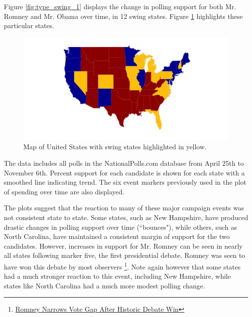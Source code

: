 \documentclass[11pt]{article}\usepackage{graphicx, color}
\newenvironment{knitrout}{}{} %
\begin{document}

Figure \ref{fig:type_swing_1} displays the change in polling support for both Mr. Romney and Mr. Obama over time, in 12 swing states. Figure \ref{fig:swing_map} highlights these particular states.

\begin{knitrout}
\color{fgcolor}\begin{figure}[H]


{\centering \includegraphics[width=\textwidth]{figure/swing_map} 

}

\caption[Map of United States with swing states highlighted in yellow]{Map of United States with swing states highlighted in yellow.\label{fig:swing_map}}
\end{figure}


\end{knitrout}


The data includes all polls in the NationalPolls.com database from April 25th to November 6th. Percent support for each candidate is shown for each state with a smoothed line indicating trend. The six event markers previously used in the plot of spending over time are also displayed.

The plots suggest that the reaction to many of these major campaign events was not consistent state to state. Some states, such as New Hampshire, have produced drastic changes in polling support over time (``bounces"), while others, such as North Carolina, have maintained a consistent margin of support for the two candidates. However, increases in support for Mr. Romney can be seen in nearly all states following marker five, the first presidential debate. Romney was seen to have won this debate by most observers \footnote{\href{http://www.gallup.com/poll/157907/romney-narrows-vote-gap-historic-debate-win.aspx}{Romney Narrows Vote Gap After Historic Debate Win}}. Note again however that some states had a much stronger reaction to this event, including New Hampshire, while states like North Carolina had a much more modest polling change.
\end{document}
